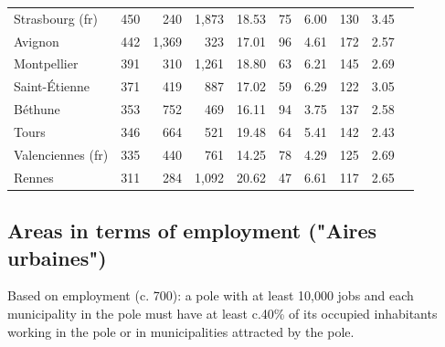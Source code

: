 \documentclass[11pt]{article}
\begin{document}
\begin{table}[H]
\begin{tabular}{llrrrrrrrr}
   Strasbourg (fr) &        450 &        240 &        1,873 &      18.53 &         75 &       6.00 &        130 &        3.45 \\
           Avignon &        442 &      1,369 &          323 &      17.01 &         96 &       4.61 &        172 &        2.57 \\
       Montpellier &        391 &        310 &        1,261 &      18.80 &         63 &       6.21 &        145 &        2.69 \\
     Saint-Étienne &        371 &        419 &          887 &      17.02 &         59 &       6.29 &        122 &        3.05 \\
           Béthune &        353 &        752 &          469 &      16.11 &         94 &       3.75 &        137 &        2.58 \\
             Tours &        346 &        664 &          521 &      19.48 &         64 &       5.41 &        142 &        2.43 \\
 Valenciennes (fr) &        335 &        440 &          761 &      14.25 &         78 &       4.29 &        125 &        2.69 \\
            Rennes &        311 &        284 &        1,092 &      20.62 &         47 &       6.61 &        117 &        2.65 \\
\bottomrule
\end{tabular}

\end{table}

\subsection{Areas in terms of employment ("Aires urbaines")}

Based on employment (c. 700): a pole with at least 10,000 jobs and each municipality in the pole must have at least c.40\% of its occupied inhabitants working in the pole or in municipalities attracted by the pole.
\end{document}
